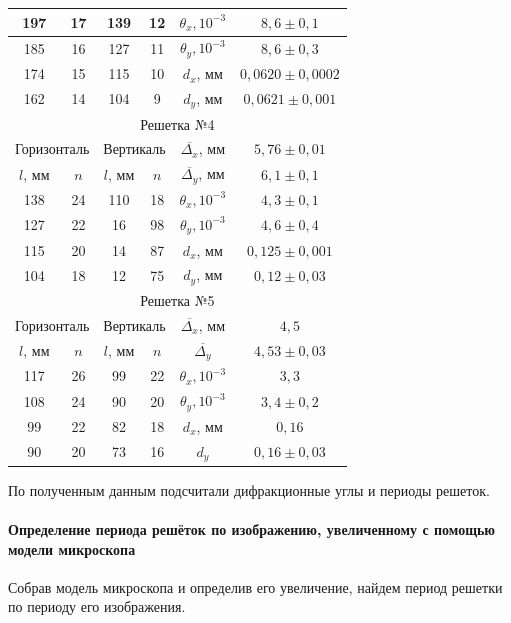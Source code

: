\documentclass[12pt]{article}
\begin{document}
\begin{center}
\begin{tabular}{|c|c|c|c||c|c|}
		\hline 
		197 & 17 & 139 & 12 & $\theta_x, 10^{-3}$ & $8,6 \pm 0,1$ \\ 
		\hline 
		185 & 16 & 127 & 11 & $\theta_y, 10^{-3}$ & $8,6 \pm 0,3$\\ 
		\hline 
		174 & 15 & 115 & 10 & $d_x$, мм  & $0,0620 \pm 0,0002$\\ 
		\hline 
		162 & 14 & 104 & 9 & $d_y$, мм & $0,0621 \pm 0,001$\\ 
		\hline
		\multicolumn{6}{|c|}{Решетка №4} \\
		\hline
		\multicolumn{2}{|c|}{Горизонталь}& \multicolumn{2}{|c||}{Вертикаль}  & $\overline{\Delta_{x}}$, мм & $5,76 \pm 0,01$ \\ 
		\hline 
		$l$, мм  & $n$ & $l$, мм & $n$  & $\overline{\Delta_{y}}$, мм & $6,1 \pm 0,1$ \\ 
		\hline 
		138 & 24 & 110 & 18 & $\theta_x, 10^{-3}$ & $4,3 \pm 0,1$\\ 
		\hline 
		127 & 22 & 16 & 98 & $\theta_y, 10^{-3}$ & $4,6 \pm 0,4$\\ 
		\hline 
		115 & 20 & 14 & 87 & $d_x$, мм & $0,125 \pm 0,001$\\ 
		\hline 
		104 & 18 & 12 & 75 & $d_y$, мм & $0,12 \pm 0,03$\\ 
		\hline
		\multicolumn{6}{|c|}{Решетка №5} \\
		\hline
		\multicolumn{2}{|c|}{Горизонталь}& \multicolumn{2}{|c||}{Вертикаль}   & $\overline{\Delta_{x}}$, мм & $4,5$ \\
		\hline 
		$l$, мм  & $n$ & $l$, мм & $n$ & $\overline{\Delta_{y}}$ & $4,53 \pm 0,03$\\ 
		\hline 
		117 & 26 & 99 & 22 & $\theta_x, 10^{-3}$ & $3,3$\\ 
		\hline 
		108 & 24 & 90 & 20 & $\theta_y, 10^{-3}$ & $3,4 \pm 0,2$\\ 
		\hline 
		99 & 22 & 82 & 18 & $d_x$, мм & $0,16$ \\ 
		\hline 
		90 & 20 & 73 & 16 & $d_y$ & $0,16 \pm 0,03$\\ 
		\hline 
	\end{tabular} 
	\end{center}
	
	
	По полученным данным подсчитали дифракционные углы и периоды решеток.
	
	\paragraph{Определение периода решёток по изображению, увеличенному	с помощью модели микроскопа}
	Собрав модель микроскопа и определив его увеличение, найдем период решетки по периоду его изображения.
	
\end{document}
